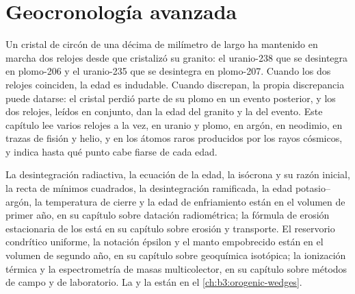 \chapter{Geocronología avanzada}\label{ch:b3:advanced-geochronology}

Un cristal de circón de una décima de milímetro de largo ha mantenido en marcha dos relojes
desde que cristalizó su granito: el uranio-238 que se desintegra en plomo-206 y
el uranio-235 que se desintegra en plomo-207. Cuando los dos relojes coinciden, la edad
es indudable. Cuando discrepan, la propia discrepancia puede datarse: el
cristal perdió parte de su plomo en un evento posterior, y los dos relojes, leídos
en conjunto, dan la edad del granito y la del evento. Este capítulo
lee varios relojes a la vez, en uranio y plomo, en argón, en neodimio, en
trazas de fisión y helio, y en los átomos raros producidos por los rayos cósmicos, y
indica hasta qué punto cabe fiarse de cada edad.

\begin{recall}
La desintegración radiactiva, la ecuación de la edad, la isócrona y su razón inicial, la
recta de mínimos cuadrados, la desintegración ramificada, la edad potasio--argón, la
temperatura de cierre y la edad de enfriamiento están en el volumen de primer año, en su capítulo sobre
datación radiométrica; la fórmula de erosión estacionaria de los  está en
su capítulo sobre erosión y transporte. El reservorio condrítico uniforme, la
notación épsilon y el manto empobrecido están en el volumen de segundo año, en su
capítulo sobre geoquímica isotópica; la ionización térmica y la espectrometría de masas
multicolector, en su capítulo sobre métodos de campo y de laboratorio. La  y
la  están en el \cref{ch:b3:orogenic-wedges}.
\end{recall}


